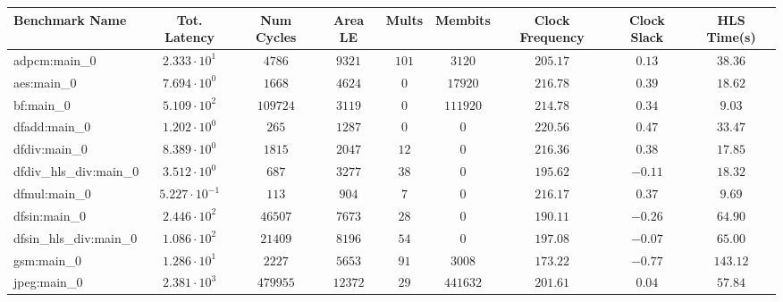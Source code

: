 \begin{tabular}{|l|c|c|c|c|c|c|c|c|}
\hline
Benchmark Name          & Tot. Latency            & Num Cycles & Area LE   & Mults   & Membits    & Clock Frequency & Clock Slack & HLS Time(s) \\
\hline
adpcm:main\_0           & $ 2.333 \cdot 10^{1}  $ & $ 4786   $ & $ 9321  $ & $ 101 $ & $ 3120   $ & $ 205.17      $ & $ 0.13    $ & $ 38.36   $ \\
aes:main\_0             & $ 7.694 \cdot 10^{0}  $ & $ 1668   $ & $ 4624  $ & $ 0   $ & $ 17920  $ & $ 216.78      $ & $ 0.39    $ & $ 18.62   $ \\
bf:main\_0              & $ 5.109 \cdot 10^{2}  $ & $ 109724 $ & $ 3119  $ & $ 0   $ & $ 111920 $ & $ 214.78      $ & $ 0.34    $ & $ 9.03    $ \\
dfadd:main\_0           & $ 1.202 \cdot 10^{0}  $ & $ 265    $ & $ 1287  $ & $ 0   $ & $ 0      $ & $ 220.56      $ & $ 0.47    $ & $ 33.47   $ \\
dfdiv:main\_0           & $ 8.389 \cdot 10^{0}  $ & $ 1815   $ & $ 2047  $ & $ 12  $ & $ 0      $ & $ 216.36      $ & $ 0.38    $ & $ 17.85   $ \\
dfdiv\_hls\_div:main\_0 & $ 3.512 \cdot 10^{0}  $ & $ 687    $ & $ 3277  $ & $ 38  $ & $ 0      $ & $ 195.62      $ & $ -0.11   $ & $ 18.32   $ \\
dfmul:main\_0           & $ 5.227 \cdot 10^{-1} $ & $ 113    $ & $ 904   $ & $ 7   $ & $ 0      $ & $ 216.17      $ & $ 0.37    $ & $ 9.69    $ \\
dfsin:main\_0           & $ 2.446 \cdot 10^{2}  $ & $ 46507  $ & $ 7673  $ & $ 28  $ & $ 0      $ & $ 190.11      $ & $ -0.26   $ & $ 64.90   $ \\
dfsin\_hls\_div:main\_0 & $ 1.086 \cdot 10^{2}  $ & $ 21409  $ & $ 8196  $ & $ 54  $ & $ 0      $ & $ 197.08      $ & $ -0.07   $ & $ 65.00   $ \\
gsm:main\_0             & $ 1.286 \cdot 10^{1}  $ & $ 2227   $ & $ 5653  $ & $ 91  $ & $ 3008   $ & $ 173.22      $ & $ -0.77   $ & $ 143.12  $ \\
jpeg:main\_0            & $ 2.381 \cdot 10^{3}  $ & $ 479955 $ & $ 12372 $ & $ 29  $ & $ 441632 $ & $ 201.61      $ & $ 0.04    $ & $ 57.84   $ \\

\end{tabular}
